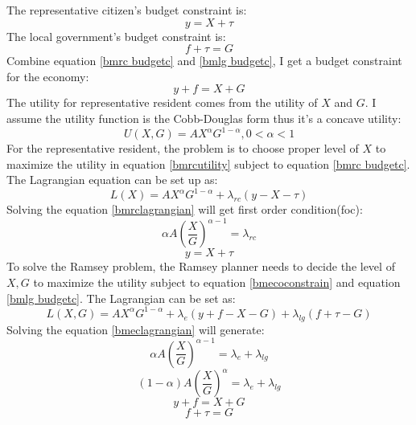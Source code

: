 The representative citizen's budget constraint is:
\begin{equation}
    y=X+\tau \label{bmrc budgetc}
\end{equation}
The local government's budget constraint is:
\begin{equation}
    f+\tau=G \label{bmlg budgetc}
\end{equation}
Combine equation \ref{bmrc budgetc} and \ref{bmlg budgetc}, I get a budget constraint for the economy:
\begin{equation}
    y+f=X+G \label{bmecoconstrain}
\end{equation}
The utility for representative resident comes from the utility of $X$ and $G$. I assume the utility function is the Cobb-Douglas form thus it's a concave utility:
\begin{equation}
    U(X,G)=AX^{\alpha}G^{1-\alpha} , 0<\alpha<1 \label{bmrcutility}
\end{equation}
For the representative resident, the problem is to choose proper level of $X$ to maximize the utility in equation \ref{bmrcutility} subject to equation \ref{bmrc budgetc}. The Lagrangian equation can be set up as:
\begin{equation}
    L(X)=AX^{\alpha}G^{1-\alpha}+\lambda_{rc}(y-X-\tau)  \label{bmrclagrangian}
\end{equation}
Solving the equation \ref{bmrclagrangian} will get first order condition(foc):
\begin{equation}
    \alpha A\left(\frac{X}{G}\right)^{\alpha-1}=\lambda_{r c} \label{lamdarc}
\end{equation}
\begin{equation}
    y=X+\tau \label{rcfoc}
\end{equation}
To solve the Ramsey problem, the Ramsey planner needs to decide the level of $X,G$ to maximize the utility subject to equation \ref{bmecoconstrain} and equation \ref{bmlg budgetc}. The Lagrangian can be set as:
\begin{equation}
    L(X,G)=AX^{\alpha}G^{1-\alpha}+\lambda_{e}(y+f-X-G)+\lambda_{lg}(f+\tau-G)  \label{bmeclagrangian}
\end{equation}
Solving the equation \ref{bmeclagrangian} will generate:
\begin{equation}
    \alpha A\left(\frac{X}{G}\right)^{\alpha-1}=\lambda_e+\lambda_{l g}
    \label{foc on X}
\end{equation}
\begin{equation}
    (1- \alpha) A\left(\frac{X}{G}\right)^{\alpha}=\lambda_e+\lambda_{l g} \label{foc on G}
\end{equation}
\begin{equation}
    y+f=X+G \label{foc on lambdae}
\end{equation}
\begin{equation}
    f+\tau=G \label{foc on lambdalg}
\end{equation}

